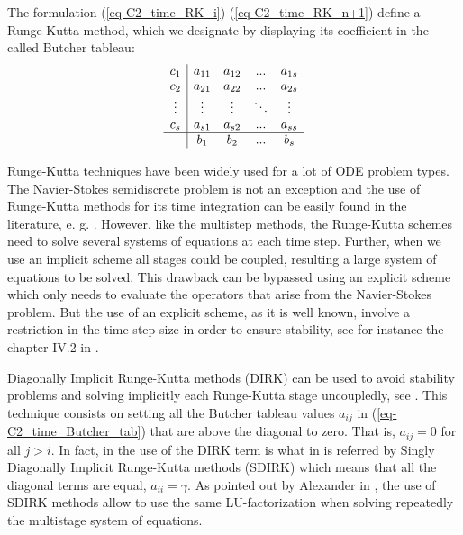 The formulation (\ref{eq-C2_time_RK_i})-(\ref{eq-C2_time_RK_n+1}) define a Runge-Kutta method, which we designate by displaying its coefficient in the called Butcher tableau:
\begin{equation}
\label{eq-C2_time_Butcher_tab}
\begin{array}{c|cccc}
c_1&a_{11}&a_{12}&...&a_{1s}\\
c_2&a_{21}&a_{22}&...&a_{2s}\\
\vdots&\vdots&\vdots&\ddots&\vdots\\
c_s&a_{s1}&a_{s2}&...&a_{ss}\\
\hline
 &b_1&b_2&...&b_s
\end{array}
\end{equation}

Runge-Kutta techniques have been widely used for a lot of ODE problem types. The Navier-Stokes semidiscrete problem is not an exception and the use of Runge-Kutta methods for its time integration can be easily found in the literature, e. g. \cite{nikitin_third-order-accurate_2006,sanderse_energy-conserving_2013,sanderse_accuracy_2012,sterner_semi-implicit_1997}. However, like the multistep methods, the Runge-Kutta schemes need to solve several systems of equations at each time step. Further, when we use an implicit scheme all stages could be coupled, resulting a large system of equations to be solved. This drawback can be bypassed using an explicit scheme which only needs to evaluate the operators that arise from the Navier-Stokes problem. But the use of an explicit scheme, as it is well known, involve a restriction in the time-step size in order to ensure stability, see for instance the chapter IV.2 in \cite{hairer_solving_1993}. 

Diagonally Implicit Runge-Kutta methods (DIRK) can be used to avoid stability problems and solving implicitly each Runge-Kutta stage uncoupledly, see \cite{alexander_diagonally_1977}. This technique consists on setting all the Butcher tableau values $a_{ij}$ in (\ref{eq-C2_time_Butcher_tab}) that are above the diagonal to zero. That is, $a_{ij} = 0$ for all $j>i$. In fact, in \cite{alexander_diagonally_1977} the use of the DIRK term is what in \cite{hairer_solving_1993} is referred by Singly Diagonally Implicit Runge-Kutta methods (SDIRK) which means that all the diagonal terms are equal, $a_{ii}=\gamma$. As pointed out by Alexander in \cite{alexander_diagonally_1977}, the use of SDIRK methods allow to use the same LU-factorization when solving repeatedly the multistage system of equations.

